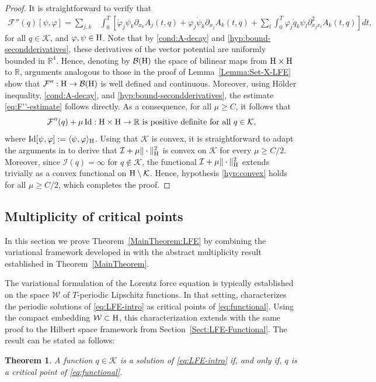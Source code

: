 \documentclass{article}
\newcommand{\boK}{\mathcal{K}}
\newcommand{\boI}{\mathcal{I}}
\newcommand{\R}{\mathbb{R}}
\newcommand{\boW}{\mathcal{W}}
\newcommand{\boF}{\mathcal{F}}
\newcommand{\dq}{\dot{q}}
\newcommand{\Hilb}{{\textnormal H}}
\newtheorem{theorem}{Theorem}[section]
\theoremstyle{definition}
\begin{document}
	\begin{proof}
		It is straightforward to verify that
		\begin{align}
			\boF''(q)[\psi,\varphi]=\sum_{j,k}&\int_0^T\left[\dot\varphi_j\psi_k\partial_{x_k}A_j(t,q)+\varphi_j\dot\psi_k\partial_{x_j}A_k(t,q) +\sum_{l}\int_0^T\varphi_j\dq_k\psi_l\partial^2_{x_jx_l}A_k(t,q)\right]dt,
		\end{align}
		for all $q\in\boK$, and $\varphi,\psi\in\Hilb$.
		Note that by \eqref{cond:A-decay} and \eqref{hyp:bound-secondderivatives}, these derivatives of the vector potential are uniformly bounded in $\R^4$. Hence, denoting by $\mathcal{B}(\Hilb)$ the space of bilinear maps from $\Hilb\times\Hilb$ to $\R$, arguments analogous to those in the proof of Lemma~\ref{Lemma:Set-X-LFE} show that $\boF'':\Hilb\to\mathcal{B}(\Hilb)$ is well defined and continuous. Moreover, using H\"older inequality, \eqref{cond:A-decay}, and \eqref{hyp:bound-secondderivatives}, the estimate \eqref{eq:F''-estimate} follows directly. As a consequence, for all $\mu\geq C$, it follows that
		\begin{equation}
			\boF''(q)+\mu\,\mathrm{Id}:\Hilb\times\Hilb\to\R \text{ is positive definite for all } q\in\boK,
		\end{equation}
		where $\mathrm{Id}[\psi,\varphi]:=\langle\psi,\varphi\rangle_\Hilb$. Using that $\boK$ is convex, it is straightforward to adapt the arguments in \cite[p.~307]{Eke-Las} to derive that $\boI+\mu\|\cdot\|_\Hilb^2$ is convex on $\boK$ for every $\mu\geq C/2$. Moreover, since $\boI(q)=\infty$ for $q\notin\boK$, the functional $\boI+\mu\|\cdot\|_\Hilb^2$ extends trivially as a convex functional on $\Hilb\setminus\boK$. Hence, hypothesis \eqref{hyp:convex} holds for all $\mu\geq C/2$, which completes the proof.
	\end{proof}

    \subsection{Multiplicity of critical points }\label{Sect-LFE-Final}
	
	In this section we prove Theorem~\ref{MainTheorem:LFE} by combining the variational framework developed in \cite{GLM} with the abstract multiplicity result established in Theorem~\ref{MainTheorem}.
	
	 The variational formulation of the Lorentz force equation is typically established on the space $\boW$ of $T$-periodic Lipschitz functions. In that setting, \cite[Theorem 6]{ABT} characterizes the periodic solutions of \eqref{eq:LFE-intro} as critical points of \eqref{eq:functional}. Using the compact embedding $\boW\subset\Hilb$, this characterization extends with the same proof to the Hilbert space framework from Section~\ref{Sect:LFE-Functional}. The result can be stated as follows:
	\begin{theorem}\label{theorem:CriticalPoint}
		A function $q\in\boK$ is a solution of \eqref{eq:LFE-intro} if, and only if, $q$ is a critical point of \eqref{eq:functional}.
	\end{theorem} 
	
\end{document}
